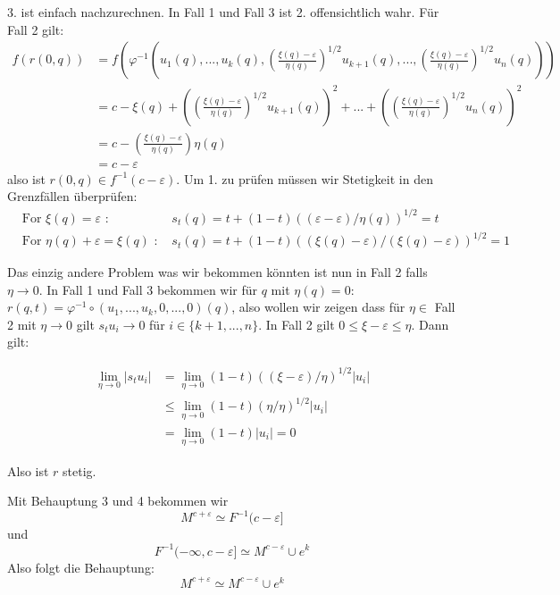 \begin{bigproof}
\begin{smallproof}
        3. ist einfach nachzurechnen. In Fall 1 und Fall 3 ist 2. offensichtlich
        wahr. Für Fall 2 gilt:
        \begin{align*} 
            f(r(0, q)) & = 
                f\left( \varphi^{-1} \left(u_1(q), ..., u_k(q), 
                \left( \frac{\xi(q) - \varepsilon}{\eta(q)} \right)^{1/2}u_{k + 1}(q), ...,
                \left( \frac{\xi(q) - \varepsilon}{\eta(q)} \right)^{1/2}u_n(q)
                \right)
                \right) \\
            & = c - \xi(q)
                + \left( \left( \frac{\xi(q) - \varepsilon}{\eta(q)} \right)^{1/2}u_{k + 1}(q) \right)^2 + ... 
                + \left( \left( \frac{\xi(q) - \varepsilon}{\eta(q)} \right)^{1/2}u_n(q) \right)^2 \\
            & = c - \left( \frac{\xi(q) - \varepsilon}{\eta(q)} \right) \eta(q) \\
            & = c - \varepsilon
        \end{align*}
        also ist $r(0, q) \in f^{-1}(c - \varepsilon)$. Um 1. zu prüfen müssen wir 
        Stetigkeit in den Grenzfällen überprüfen:
        \begin{align*}
            & \text{For } \xi(q) = \varepsilon \text{ : }
                & s_t(q)  =t + (1 - t)((\varepsilon - \varepsilon)/\eta(q))^{1/2} = t \\
            & \text{For } \eta(q) + \varepsilon = \xi(q) \text{ : }
                & s_t(q) = t + (1 - t)((\xi(q) - \varepsilon)/(\xi(q) - \varepsilon))^{1/2} = 1
        \end{align*}

        Das einzig andere Problem was wir bekommen könnten ist nun in Fall 2 falls
        $\eta \to 0$. In Fall 1 und Fall 3 bekommen wir für $q$ mit $\eta(q) = 0$:
        $r(q, t) = \varphi^{-1} \circ (u_1, ..., u_k, 0, ..., 0)(q)$, also wollen
        wir zeigen dass für $\eta \in $ Fall 2 mit $\eta \to 0$ gilt $s_tu_i \to 0$
        für $i \in \{k+1, ..., n\}$. In Fall 2 gilt
        $0 \leq \xi - \varepsilon \leq \eta$. Dann gilt:

        \begin{align*}
            \lim\limits_{\eta \to 0} | s_t u_i |
            & = \lim\limits_{\eta \to 0} (1 - t)((\xi - \varepsilon)/\eta)^{1/2} | u_i | \\
            & \leq \lim\limits_{\eta \to 0} (1 - t)(\eta/\eta)^{1/2}|u_i| \\
            & = \lim\limits_{\eta \to 0} (1 - t)|u_i| = 0 
        \end{align*}
        
        Also ist $r$ stetig.
    \end{smallproof}

    Mit Behauptung 3 und 4 bekommen wir
    \[ M^{c + \varepsilon} \simeq F^{-1}(c - \varepsilon] \]
    und 
    \[ F^{-1}(-\infty, c - \varepsilon] \simeq M^{c - \varepsilon} \cup e^k \]
    Also folgt die Behauptung:
    \[ M^{c + \varepsilon} \simeq M^{c - \varepsilon} \cup e^k \]

\end{bigproof}